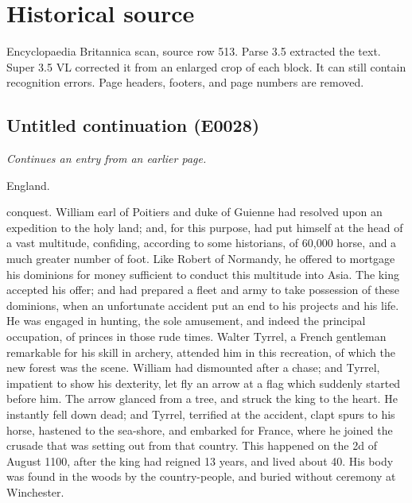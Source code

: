 \documentclass{article}
\begin{document}
\section*{Historical source}
Encyclopaedia Britannica scan, source row 513. Parse 3.5 extracted the text. Super 3.5 VL corrected it from an enlarged crop of each block. It can still contain recognition errors.
Page headers, footers, and page numbers are removed.

\subsection*{Untitled continuation (E0028)}
\textit{Continues an entry from an earlier page.}

England.

conquest. William earl of Poitiers and duke of Guienne had resolved upon an expedition to the holy land; and, for this purpose, had put himself at the head of a vast multitude, confiding, according to some historians, of 60,000 horse, and a much greater number of foot. Like Robert of Normandy, he offered to mortgage his dominions for money sufficient to conduct this multitude into Asia. The king accepted his offer; and had prepared a fleet and army to take possession of these dominions, when an unfortunate accident put an end to his projects and his life. He was engaged in hunting, the sole amusement, and indeed the principal occupation, of princes in those rude times. Walter Tyrrel, a French gentleman remarkable for his skill in archery, attended him in this recreation, of which the new forest was the scene. William had dismounted after a chase; and Tyrrel, impatient to show his dexterity, let fly an arrow at a flag which suddenly started before him. The arrow glanced from a tree, and struck the king to the heart. He instantly fell down dead; and Tyrrel, terrified at the accident, clapt spurs to his horse, hastened to the sea-shore, and embarked for France, where he joined the crusade that was setting out from that country. This happened on the 2d of August 1100, after the king had reigned 13 years, and lived about 40. His body was found in the woods by the country-people, and buried without ceremony at Winchester.
\end{document}
